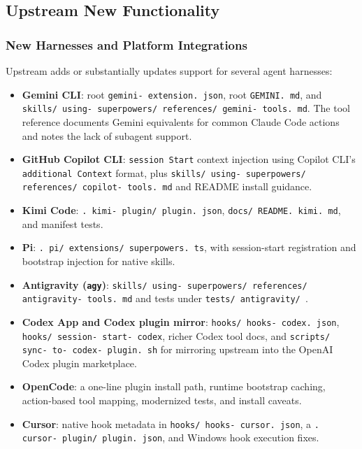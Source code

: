 \documentclass[twocolumn,10pt,letterpaper]{article}
\begin{document}
\subsection{Upstream New Functionality}

\subsubsection{New Harnesses and Platform Integrations}

Upstream adds or substantially updates support for several agent harnesses:


\begin{itemize}
\setlength{\itemsep}{0pt}
\setlength{\parskip}{0pt}
  \item \textbf{Gemini CLI}: root \texttt{gemini- extension. json}, root \texttt{GEMINI. md}, and \texttt{skills/ using- superpowers/ references/ gemini- tools. md}. The tool reference documents Gemini equivalents for common Claude Code actions and notes the lack of subagent support.
  \item \textbf{GitHub Copilot CLI}: \texttt{session Start} context injection using Copilot CLI's \texttt{additional Context} format, plus \texttt{skills/ using- superpowers/ references/ copilot- tools. md} and README install guidance.
  \item \textbf{Kimi Code}: \texttt{. kimi- plugin/ plugin. json}, \texttt{docs/ README. kimi. md}, and manifest tests.
  \item \textbf{Pi}: \texttt{. pi/ extensions/ superpowers. ts}, with session-start registration and bootstrap injection for native skills.
  \item \textbf{Antigravity (\texttt{agy})}: \texttt{skills/ using- superpowers/ references/ antigravity- tools. md} and tests under \texttt{tests/ antigravity/ }.
  \item \textbf{Codex App and Codex plugin mirror}: \texttt{hooks/ hooks- codex. json}, \texttt{hooks/ session- start- codex}, richer Codex tool docs, and \texttt{scripts/ sync- to- codex- plugin. sh} for mirroring upstream into the OpenAI Codex plugin marketplace.
  \item \textbf{OpenCode}: a one-line plugin install path, runtime bootstrap caching, action-based tool mapping, modernized tests, and install caveats.
  \item \textbf{Cursor}: native hook metadata in \texttt{hooks/ hooks- cursor. json}, a \texttt{. cursor- plugin/ plugin. json}, and Windows hook execution fixes.
\end{itemize}
\end{document}

